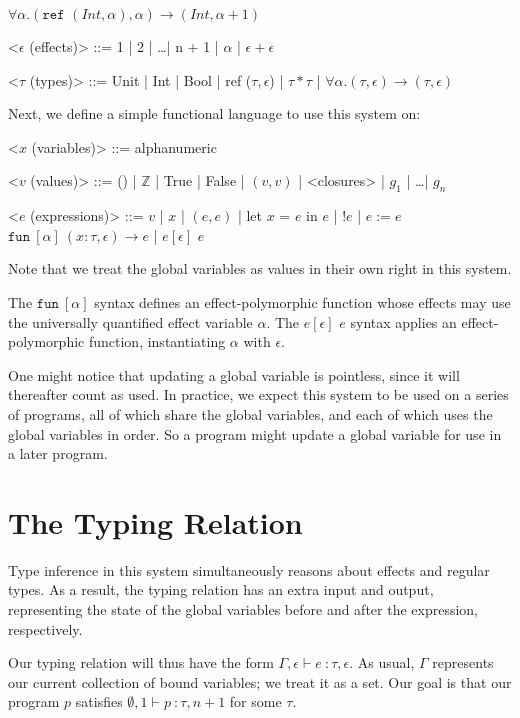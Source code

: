 \documentclass{article}
\newcommand{\Z}{\mathbb{Z}}
\begin{document}
$\forall \alpha. (\texttt{ref } (Int, \alpha), \alpha) \rightarrow (Int, \alpha+1)$

\begin{grammar}
	<$\epsilon$ (effects)> ::= 1 | 2 | \dots | n + 1 | $\alpha$ | $\epsilon + \epsilon$
	
	<$\tau$ (types)> ::= Unit | Int | Bool | ref ($\tau, \epsilon$) | $\tau * \tau$ | $\forall \alpha.(\tau, \epsilon) \rightarrow (\tau, \epsilon)$
\end{grammar}

Next, we define a simple functional language to use this system on:

\begin{grammar}
	<$x$ (variables)> ::= alphanumeric
	
	<$v$ (values)> ::= () | $\Z$ | True | False | $(v, v)$ | <closures> | $g_1$ | \dots | $g_n$
	
	<$e$ (expressions)> ::= $v$ | $x$ | $(e,e)$ | let $x$ = $e$ in $e$ | !$e$ | $e := e$ 
	\alt $\texttt{fun}\ [\alpha]\ (x:\tau, \epsilon) \rightarrow e$ | $e[\epsilon]$ $e$
\end{grammar} 

Note that we treat the global variables as values in their own right in this system.

The $\texttt{fun}\ [\alpha]$ syntax defines an effect-polymorphic function whose effects may use the universally quantified effect variable $\alpha$. The $e[\epsilon]$ $e$ syntax applies an effect-polymorphic function, instantiating $\alpha$ with $\epsilon$.

One might notice that updating a global variable is pointless, since it will thereafter count as used. In practice, we expect this system to be used on a series of programs, all of which share the global variables, and each of which uses the global variables in order. So a program might update a global variable for use in a later program.

\section*{The Typing Relation}

Type inference in this system simultaneously reasons about effects and regular types. As a result, the typing relation has an extra input and output, representing the state of the global variables before and after the expression, respectively.

Our typing relation will thus have the form $\Gamma, \epsilon \vdash e\ \colon \tau, \epsilon$. As usual, $\Gamma$ represents our current collection of bound variables; we treat it as a set. Our goal is that our program $p$ satisfies $\emptyset, 1 \vdash p\ \colon \tau, n+1$ for some $\tau$.
\end{document}
